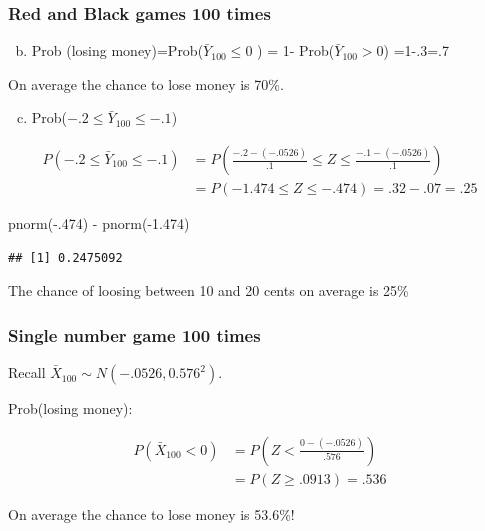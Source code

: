 \documentclass[
  ignorenonframetext,
]{beamer}
\newenvironment{Shaded}{\begin{snugshade}}{\end{snugshade}}
\newcommand{\DecValTok}[1]{\textcolor[rgb]{0.00,0.00,0.81}{#1}}
\newcommand{\FloatTok}[1]{\textcolor[rgb]{0.00,0.00,0.81}{#1}}
\newcommand{\FunctionTok}[1]{\textcolor[rgb]{0.00,0.00,0.00}{#1}}
\newcommand{\NormalTok}[1]{#1}
\newcommand{\SpecialCharTok}[1]{\textcolor[rgb]{0.00,0.00,0.00}{#1}}
\providecommand{\tightlist}{%
  \setlength{\itemsep}{0pt}\setlength{\parskip}{0pt}}
\begin{document}
\begin{frame}[fragile]
\frametitle{Red and Black games 100 times}

\begin{enumerate}
[(a)]
\setcounter{enumi}{1}
\tightlist
\item
  Prob (losing money)=Prob(\(\bar{Y}_{100} \leq 0\) ) = 1-
  Prob(\(\bar{Y}_{100} > 0\)) =1-.3=.7
\end{enumerate}

On average the chance to lose money is 70\%.

\begin{enumerate}
[a)]
\setcounter{enumi}{2}
\tightlist
\item
  Prob(\(-.2 \leq \bar{Y}_{100} \leq -.1\))
\end{enumerate}

\[\begin{split}
P(-.2 \leq \bar{Y}_{100} \leq -.1) &=
P\left(\frac{-.2-(-.0526)}{.1} \leq Z \leq \frac{-.1-(-.0526)}{.1} \right) \\
&= P\left(-1.474 \leq Z \leq -.474 \right) = .32 - .07 = .25
\end{split}\]

\begin{Shaded}
\begin{Highlighting}[]
\FunctionTok{pnorm}\NormalTok{(}\SpecialCharTok{{-}}\NormalTok{.}\DecValTok{474}\NormalTok{) }\SpecialCharTok{{-}} \FunctionTok{pnorm}\NormalTok{(}\SpecialCharTok{{-}}\FloatTok{1.474}\NormalTok{)}
\end{Highlighting}
\end{Shaded}

\begin{verbatim}
## [1] 0.2475092
\end{verbatim}

The chance of loosing between 10 and 20 cents on average is 25\%
\end{frame}

\begin{frame}
\frametitle{Single number game 100 times}

Recall \(\bar{X}_{100} \sim N(-.0526, 0.576^2)\).

Prob(losing money):

\[\begin{split}
P(\bar{X}_{100} < 0) &=
P\left(Z < \frac{0-(-.0526)}{.576} \right) \\
&= P\left(Z \geq .0913 \right) = .536
\end{split}\]

On average the chance to lose money is 53.6\%!
\end{frame}
\end{document}
